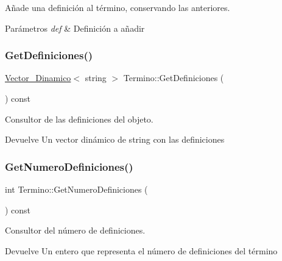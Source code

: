 Añade una definición al término, conservando las anteriores. 


\begin{DoxyParams}{Parámetros}
{\em def} & Definición a añadir \\
\hline
\end{DoxyParams}
\mbox{\label{classTermino_a19f98e7a2364068d2e6d99185d4f23d4}} 
\subsubsection{\texorpdfstring{GetDefiniciones()}{GetDefiniciones()}}
{\footnotesize\ttfamily \mbox{\hyperlink{classVector__Dinamico}{Vector\+\_\+\+Dinamico}}$<$ string $>$ Termino\+::\+Get\+Definiciones (\begin{DoxyParamCaption}{ }\end{DoxyParamCaption}) const}



Consultor de las definiciones del objeto. 

\begin{DoxyReturn}{Devuelve}
Un vector dinámico de string con las definiciones 
\end{DoxyReturn}
\mbox{\label{classTermino_ad3aac507f0f33d89abf34db00f92606f}} 
\subsubsection{\texorpdfstring{GetNumeroDefiniciones()}{GetNumeroDefiniciones()}}
{\footnotesize\ttfamily int Termino\+::\+Get\+Numero\+Definiciones (\begin{DoxyParamCaption}{ }\end{DoxyParamCaption}) const}



Consultor del número de definiciones. 

\begin{DoxyReturn}{Devuelve}
Un entero que representa el número de definiciones del término 
\end{DoxyReturn}
\mbox{\label{classTermino_a9cff6f16a62ffa3c8c2c241a33cbd04d}} 
